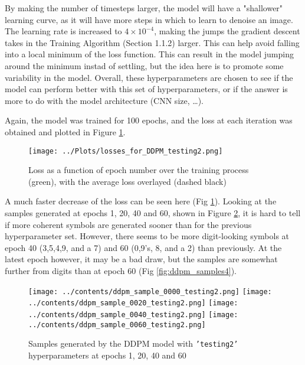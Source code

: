 \documentclass[12pt]{report} %
\begin{document}
By making the number of timesteps larger, the model will have a "shallower" learning curve, as it will have more steps in which to learn to denoise an image. The learning rate is increased to $4 \times 10^{-4}$, making the jumps the gradient descent takes in the Training Algorithm (Section 1.1.2) larger. This can help avoid falling into a local minimum of the loss function. This can result in the model jumping around the minimum instad of settling, but the idea here is to promote some variability in the model. Overall, these hyperparameters are chosen to see if the model can perform better with this set of hyperparameters, or if the answer is more to do with the model architecture (CNN size, \dots).

Again, the model was trained for 100 epochs, and the loss at each iteration was obtained and plotted in Figure \ref{fig:loss2}.

\begin{figure}[ht]
  \centering
  \texttt{[image: ../Plots/losses\_for\_DDPM\_testing2.png]}
  \captionsetup{font=footnotesize}
  \caption{Loss as a function of epoch number over the training process (green), with the average loss overlayed (dashed black)}
  \label{fig:loss2}
\end{figure}

A much faster decrease of the loss can be seen here (Fig \ref{fig:loss2}). Looking at the samples generated at epochs 1, 20, 40 and 60, shown in Figure \ref{fig:ddpm_samples3}, it is hard to tell if more coherent symbols are generated sooner than for the previous hyperparameter set. However, there seems to be more digit-looking symbols at epoch 40 (3,5,4,9, and a 7) and 60 (0,9's, 8, and a 2) than previously. At the latest epoch however, it may be a bad draw, but the samples are somewhat further from digits than at epoch 60 (Fig \ref{fig:ddpm_samples4}).

\begin{figure}[ht]
  \centering
  \texttt{[image: ../contents/ddpm\_sample\_0000\_testing2.png]}
  \texttt{[image: ../contents/ddpm\_sample\_0020\_testing2.png]}
  \texttt{[image: ../contents/ddpm\_sample\_0040\_testing2.png]}
  \texttt{[image: ../contents/ddpm\_sample\_0060\_testing2.png]}
  \captionsetup{font=footnotesize}
  \caption{Samples generated by the DDPM model with \texttt{'testing2'} hyperparameters at epochs 1, 20, 40 and 60}
  \label{fig:ddpm_samples3}
\end{figure}
\end{document}
